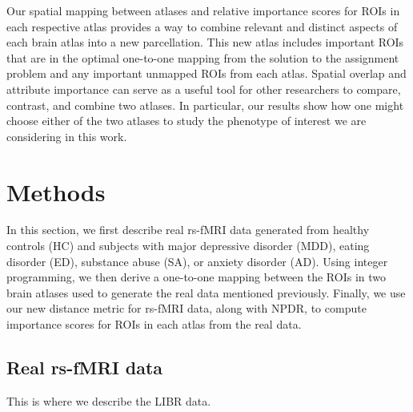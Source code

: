 \documentclass[10pt,letterpaper]{article}\usepackage[]{graphicx}\usepackage[]{color}
\begin{document}
Our spatial mapping between atlases and relative importance scores for ROIs in each respective atlas provides a way to combine relevant and distinct aspects of each brain atlas into a new parcellation. This new atlas includes important ROIs that are in the optimal one-to-one mapping from the solution to the assignment problem and any important unmapped ROIs from each atlas. Spatial overlap and attribute importance can serve as a useful tool for other researchers to compare, contrast, and combine two atlases. In particular, our results show how one might choose either of the two atlases to study the phenotype of interest we are considering in this work.

\section{Methods}
In this section, we first describe real rs-fMRI data generated from healthy controls (HC) and subjects with major depressive disorder (MDD), eating disorder (ED), substance abuse (SA), or anxiety disorder (AD). Using integer programming, we then derive a one-to-one mapping between the ROIs in two brain atlases used to generate the real data mentioned previously. Finally, we use our new distance metric for rs-fMRI data, along with NPDR, to compute importance scores for ROIs in each atlas from the real data.

\subsection{Real rs-fMRI data}
This is where we describe the LIBR data.
\end{document}
